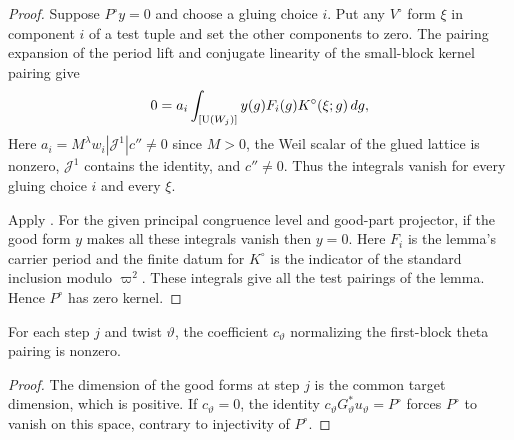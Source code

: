 \begin{proof}
Suppose $P^\circ y=0$ and choose a gluing choice $i$. Put any $V^\circ$ form $\xi$ in component $i$ of a test tuple and set the other components to zero. The pairing expansion of the period lift and conjugate linearity of the small-block kernel pairing give
\[
 0=a_i\int_{[\operatorname{U}(W_j)]} y(g)F_i(g)K^\circ(\xi;g)\,dg ,
\]
Here $a_i=M^\lambda w_i|\mathcal J^1|c''\ne0$ since $M>0$, the Weil scalar of the glued lattice is nonzero, $\mathcal J^1$ contains the identity, and $c''\ne0$. Thus the integrals vanish for every gluing choice $i$ and every $\xi$.

Apply . For the given principal congruence level and good-part projector, if the good form $y$ makes all these integrals vanish then $y=0$. Here $F_i$ is the lemma's carrier period and the finite datum for $K^\circ$ is the indicator of the standard inclusion modulo $\varpi^2$. These integrals give all the test pairings of the lemma. Hence $P^\circ$ has zero kernel.
\end{proof}


\begin{lemma}
\label{lem:c-period-factor}
\emitthmsource
For each step $j$ and twist $\vartheta$, the coefficient $c_\vartheta$ normalizing the first-block theta pairing is nonzero.
\end{lemma}

\begin{proof}
The dimension of the good forms at step $j$ is the common target dimension, which is positive. If $c_\vartheta=0$, the identity $c_\vartheta G_\vartheta^*u_\vartheta=P^\circ$ forces $P^\circ$ to vanish on this space, contrary to injectivity of $P^\circ$.
\end{proof}

